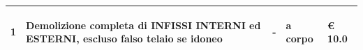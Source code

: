 \documentclass[a4paper]{article}
\begin{document}
\begin{tabular}{ | L{10mm} |  L{86mm} | L{12mm} | L{12mm} | L{16mm} | }
                              \vspace{2.5mm}
                              \begin{spacing}{0}
                           1
                              \end{spacing} &
                              \vspace{2.5mm}
                              \begin{spacing}{0}
                           Demolizione completa di INFISSI INTERNI ed ESTERNI, escluso falso telaio se idoneo
                              \end{spacing} &
                              \vspace{2.5mm}
                              \begin{spacing}{0}
                           -
                              \end{spacing} &
                              \vspace{2.5mm}
                              \begin{spacing}{0}
                           a corpo
                              \end{spacing} &
                              \vspace{2.5mm}
                              \begin{spacing}{0}
                                \euro\hfill 
                            10.0
                              \end{spacing} \\
                              \hline
            

\end{tabular}
\end{document}
